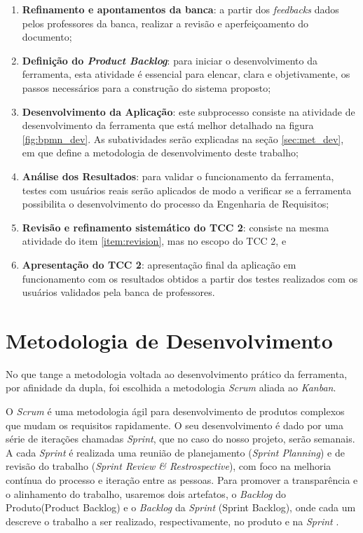 \begin{enumerate}
    \item \textbf{Refinamento e apontamentos da banca}: a partir dos \textit{feedbacks} dados pelos professores da banca, realizar a revisão e aperfeiçoamento do documento;
    \item \textbf{Definição do \textit{Product Backlog}}: para iniciar o desenvolvimento da ferramenta, esta atividade é essencial para elencar, clara e objetivamente, os passos necessários para a construção do sistema proposto;
    \item \textbf{Desenvolvimento da Aplicação}: este subprocesso consiste na atividade de desenvolvimento da ferramenta que está melhor detalhado na figura \ref{fig:bpmn_dev}. As subatividades serão explicadas na seção \ref{sec:met_dev}, em que define a metodologia de desenvolvimento deste trabalho;
    \item \textbf{Análise dos Resultados}: para validar o funcionamento da ferramenta, testes com usuários reais serão aplicados de modo a verificar se a ferramenta possibilita o desenvolvimento do processo da Engenharia de Requisitos;
    \item \textbf{Revisão e refinamento sistemático do TCC 2}: consiste na mesma atividade do item \ref{item:revision}, mas no escopo do TCC 2, e
    \item \textbf{Apresentação do TCC 2}: apresentação final da aplicação em funcionamento com os resultados obtidos a partir dos testes realizados com os usuários validados pela banca de professores.
\end{enumerate}

\section{Metodologia de Desenvolvimento}

No que tange a metodologia voltada ao desenvolvimento prático da ferramenta, por afinidade da dupla, foi escolhida a metodologia \textit{Scrum} aliada ao \textit{Kanban}.

O \textit{Scrum} é uma metodologia ágil para desenvolvimento de produtos complexos que mudam os requisitos rapidamente. O seu desenvolvimento é dado por uma série de iterações chamadas \textit{Sprint}, que no caso do nosso projeto, serão semanais. A cada \textit{Sprint} é realizada uma reunião de planejamento (\textit{Sprint Planning}) e de revisão do trabalho (\textit{Sprint Review \& Restrospective}), com foco na melhoria contínua do processo e iteração entre as pessoas. Para promover a transparência e o alinhamento do trabalho, usaremos dois artefatos, o \textit{Backlog} do Produto(Product Backlog) e o \textit{Backlog} da \textit{Sprint} (Sprint Backlog), onde cada um descreve o trabalho a ser realizado, respectivamente, no produto e na \textit{Sprint} \cite{carolipaulo2021}.

